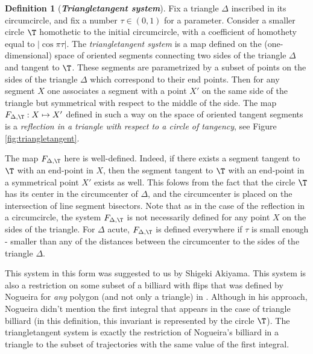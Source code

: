 \documentclass[12pt]{article}
\theoremstyle{definition}
\newtheorem{definition}{Definition}
\begin{document}
\begin{definition}[\textbf{\emph{Triangletangent system}}]\label{def:triangletangent_system_3}
Fix a triangle $\Delta$ inscribed in its circumcircle, and fix a number $\tau \in (0,1)$ for a parameter. Consider a smaller circle $\T$ homothetic to the initial circumcircle, with a coefficient of homothety equal to $\left| \cos \pi \tau\right|$. The \emph{triangletangent system} is a map defined on the (one-dimensional) space of oriented segments connecting two sides of the triangle $\Delta$ and tangent to $\T$. These segments are parametrized by a subset of points on the sides of the triangle $\Delta$ which correspond to their end points. Then for any segment $X$ one associates a segment with a point $X'$ on the same side of the triangle but symmetrical with respect to the middle of the side. The map $F_{\Delta, \T}: X \mapsto X'$ defined in such a way on the space of oriented tangent segments is a \emph{reflection in a triangle with respect to a circle of tangency}, see Figure \ref{fig:triangletangent}.
\end{definition}

The map $F_{\Delta, \T}$ here is well-defined. Indeed, if there exists a segment tangent to $\T$ with an end-point in $X$, then the segment tangent to $\T$ with an end-point in a symmetrical point $X'$ exists as well. This folows from the fact that the circle $\T$ has its center in the circumcenter of $\Delta$, and the circumcenter is placed on the intersection of line segment bisectors. Note that as in the case of the reflection in a circumcircle, the system $F_{\Delta, \T}$ is not necessarily defined for any point $X$ on the sides of the triangle. For $\Delta$ acute, $F_{\Delta, \T}$ is defined everywhere if $\tau$ is small enough - smaller than any of the distances between the circumcenter to the sides of the triangle $\Delta$.

This system in this form was suggested to us by Shigeki Akiyama. This system is also a restriction on some subset of a billiard with flips that was defined by Nogueira for \emph{any} polygon (and not only a triangle) in \cite{N89}. Although in his approach, Nogueira didn't mention the first integral that appears in the case of triangle billiard (in this definition, this invariant is represented by the circle $\T$). The triangletangent system is exactly the restriction of Nogueira's billiard in a triangle to the subset of trajectories with the same value of the first integral.
\end{document}
